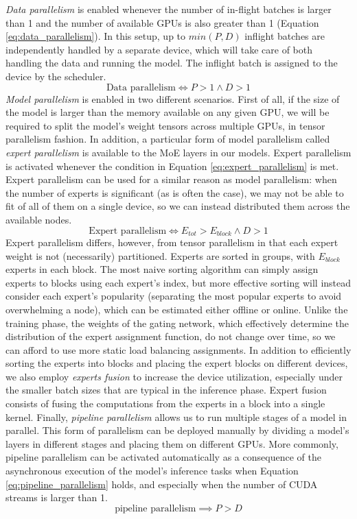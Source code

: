 \textit{Data parallelism} is enabled whenever the number of in-flight batches is larger than 1 and the number of available GPUs is also greater than 1 (Equation \ref{eq:data_parallelism}). In this setup, up to $min(P, D)$ inflight batches are independently handled by a separate device, which will take care of both handling the data and running the model. The inflight batch is assigned to the device by the scheduler. 
\begin{equation}\label{eq:data_parallelism}
    \text{Data parallelism} \iff P > 1  \wedge D > 1
\end{equation}
\textit{Model parallelism} is enabled in two different scenarios. First of all, if the size of the model is larger than the memory available on any given GPU, we will be required to split the model's weight tensors across multiple GPUs, in tensor parallelism fashion. In addition, a particular form of model parallelism called \textit{expert parallelism} is available to the MoE layers in our models. Expert parallelism is activated whenever the condition in Equation \ref{eq:expert_parallelism} is met. Expert parallelism can be used for a similar reason as model parallelism: when the number of experts is significant (as is often the case), we may not be able to fit of all of them on a single device, so we can instead distributed them across the available nodes.
\begin{equation}\label{eq:expert_parallelism}
    \text{Expert parallelism} \iff E_{tot} > E_{block} \wedge D > 1
\end{equation}
Expert parallelism differs, however, from tensor parallelism in that each expert weight is not (necessarily) partitioned. Experts are sorted in groups, with $E_{block}$ experts in each block. The most naive sorting algorithm can simply assign experts to blocks using each expert's index, but more effective sorting will instead consider each expert's popularity (separating the most popular experts to avoid overwhelming a node), which can be estimated either offline or online. Unlike the training phase, the weights of the gating network, which effectively determine the distribution of the expert assignment function, do not change over time, so we can afford to use more static load balancing assignments. 
In addition to efficiently sorting the experts into blocks and placing the expert blocks on different devices, we also employ \textit{experts fusion} to increase the device utilization, especially under the smaller batch sizes that are typical in the inference phase. Expert fusion consists of fusing the computations from the experts in a block into a single kernel.
Finally, \textit{pipeline parallelism} allows us to run multiple stages of a model in parallel. This form of parallelism can be deployed manually by dividing a model's layers in different stages and placing them on different GPUs. More commonly, pipeline parallelism can be activated automatically as a consequence of the asynchronous execution of the model's inference tasks when Equation \ref{eq:pipeline_parallelism} holds, and especially when the number of CUDA streams is larger than 1.
\begin{equation}\label{eq:pipeline_parallelism}
    \text{pipeline parallelism} \implies P > D
\end{equation}

